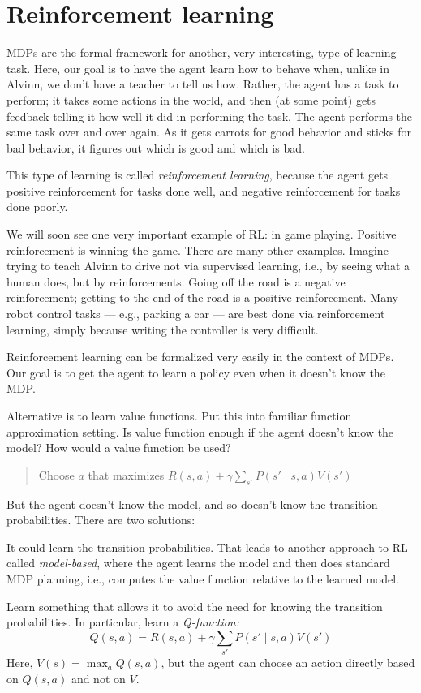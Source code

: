 \section{Reinforcement learning}
MDPs are the formal framework for another, very interesting, type of
learning task.  Here, our goal is to have the agent learn how to behave
when, unlike in Alvinn, we don't have a teacher to tell us how.  Rather, the
agent has a task to perform; it takes some actions in the world, and then (at
some point) gets feedback telling it how well it did in performing the task.
The agent performs the same task over and over again.  As it gets carrots for
good behavior and sticks for bad behavior, it figures out which is good and
which is bad.  

This type of learning is called {\em reinforcement learning}, because the
agent gets positive reinforcement for tasks done well, and negative
reinforcement for tasks done poorly.

We will soon see one very important example of RL: in game playing.
Positive reinforcement is winning the game.  There are many other examples.
Imagine trying to teach Alvinn to drive not via supervised learning, i.e.,
by seeing what a human does, but by reinforcements.  Going off the road is a
negative reinforcement; getting to the end of the road is a positive
reinforcement.  Many robot control tasks --- e.g., parking a car --- are
best done via reinforcement learning, simply because writing the controller
is very difficult. 

Reinforcement learning can be formalized very easily in the context of MDPs.
Our goal is to get the agent to learn a policy even when it doesn't know the
MDP.

Alternative is to learn value functions.  Put this into familiar function
approximation setting.  Is value function enough if the agent doesn't know
the model?  How would a value function be used?
\begin{quote}
Choose $a$ that maximizes $R(s,a) + \gamma \sum_{s'} P(s' \mid s,a) V(s')$
\end{quote}
But the agent doesn't know the model, and so doesn't know the transition
probabilities.  There are two solutions:
\bitem
\item
It could learn the transition probabilities.  That leads to another approach
to RL called {\em model-based}, where the agent learns the model and then
does standard MDP planning, i.e., computes the value function relative to
the learned model.
\item
Learn something that allows it to avoid the need for knowing the transition
probabilities.  In particular, learn a {\em Q-function:}
\[
Q(s,a) = R(s,a) + \gamma \sum_{s'} P(s' \mid s,a) V(s')
\]
Here, $V(s) = \max_a Q(s,a)$, but the agent can choose an action directly
based on $Q(s,a)$ and not on $V$.
\eitem

